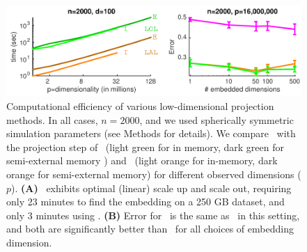 \documentclass[10pt]{article}
\begin{document}

\begin{figure}[h!]
\centering
\includegraphics[width=1\linewidth]{../Figs/scalability}
\caption{
Computational efficiency of various low-dimensional projection methods. In all cases, $n=2000$, and we used spherically symmetric  simulation parameters (see Methods for details).   We compare \Pca~with the projection step of \Lol~(light green for in memory, dark green for semi-external memory ) and \Lfl~(light orange for in-memory, dark orange for semi-external memory) for different observed dimensions ($p$). \textbf{(A)} \Lol~exhibits optimal (linear) scale up and scale out, requiring only 23 minutes to find the embedding on a 250 GB dataset, and only 3 minutes using \Lal.  \textbf{(B)} Error for \Lal~is the same as \Lol~in this setting, and both are significantly better than \PoF~for all choices of embedding dimension.  
}
\label{f:speed}
\end{figure}
\end{document}
